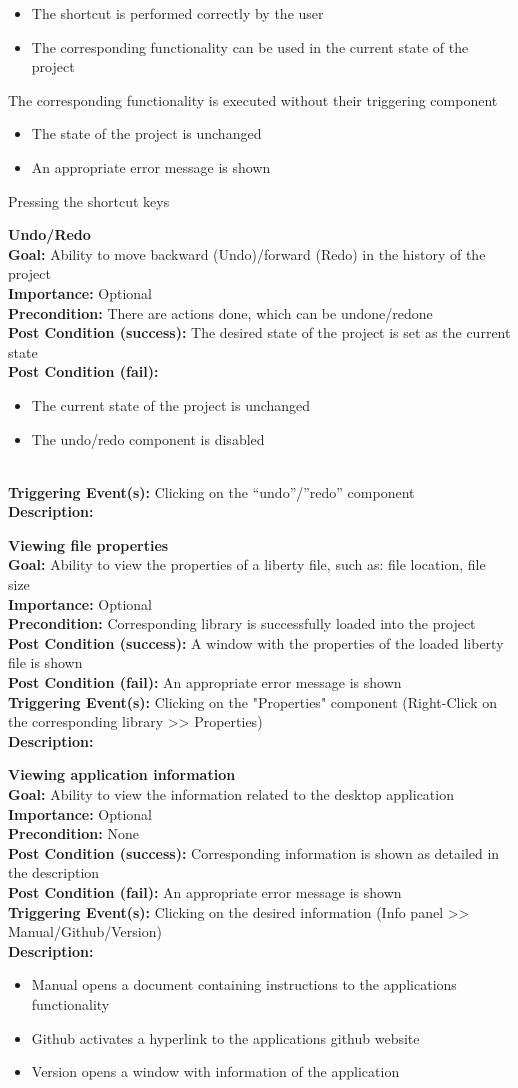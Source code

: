 \documentclass[10pt,a4paper]{report}
\newcommand{\precondition}[1]{
    \textbf{Precondition: } #1 \leavevmode \\
}
\newcommand{\FRODescription}[8]{
    \textbf{#1} \leavevmode \\
    \textbf{Goal: } #2 \leavevmode \\
    \textbf{Importance: } #3 \leavevmode \\
    \precondition{#4}
    \textbf{Post Condition (success): } #5 \leavevmode \\
    \textbf{Post Condition (fail): } #6 \leavevmode \\
    \textbf{Triggering Event(s): } #7 \leavevmode \\
    \textbf{Description: } \leavevmode \\
    #8}
\begin{document}
\begin{FRO}
{\begin{itemize}
        \item The shortcut is performed correctly by the user
        \item The corresponding functionality can be used in the current state of the project
    \end{itemize}}
    {The corresponding functionality is executed without their triggering component}
    {\begin{itemize}
        \item The state of the project is unchanged
        \item An appropriate error message is shown
    \end{itemize}}
    {Pressing the shortcut keys}
    \item \FRODescription{Undo/Redo} %
    {Ability to move backward (Undo)/forward (Redo) in the history of the project}
    {Optional}
    {There are actions done, which can be undone/redone}
    {The desired state of the project is set as the current state}
    {\begin{itemize}
        \item The current state of the project is unchanged
        \item The undo/redo component is disabled
    \end{itemize}}
    {Clicking on the “undo”/”redo” component}
    \item \FRODescription{Viewing file properties}
    {Ability to view the properties of a liberty file, such as: file location, file size}
    {Optional}
    {Corresponding library is successfully loaded into the project}
    {A window with the properties of the loaded liberty file is shown}
    {An appropriate error message is shown}
    {Clicking on the "Properties" component (Right-Click on the corresponding library  >> Properties)}
    \item \FRODescription{Viewing application information}
    {Ability to view the information related to the desktop application}
    {Optional}
    {None}
    {Corresponding information is shown as detailed in the description}
    {An appropriate error message is shown}
    {Clicking on the desired information (Info panel >> Manual/Github/Version)}
    {\begin{itemize}
        \item Manual opens a document containing instructions to the applications functionality
        \item Github activates a hyperlink to the applications github website
        \item Version opens a window with information of the application

\end{itemize}}
\end{FRO}
\end{document}
